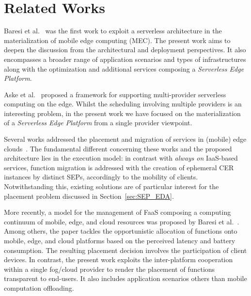 \section{Related Works}\label{sec:related_works}



Baresi et al.~\cite{GarrigaMendonca2017} was the first work to exploit a serverless architecture in the materialization of mobile edge computing (MEC). The present work aims to  deepen the discussion from the architectural and deployment perspectives. It also encompasses a broader range of application scenarios and types of infrastructures along with the optimization and additional services composing a \textit{Serverless Edge Platform}.

Aske et al.~\cite{Aske:2018} proposed a framework for supporting multi-provider serverless computing on the edge. Whilst the scheduling involving multiple 
providers is an interesting problem, in the present work we have focused on the materialization of a \textit{Serverless Edge Platform} from a single provider viewpoint. %

Several works addressed the placement and migration of services in (mobile) edge clouds~\cite{Wang:2015a,Plachy:2016,Machen:2018}. The fundamental different concerning these works and the proposed architecture lies in the execution model: in contrast with \textit{always on} IaaS-based services, %
function migration is addressed with the creation of ephemeral CER instances by distinct SEPs, accordingly to the mobility of clients. Notwithstanding this, existing solutions are of particular interest for the placement problem discussed in Section~\ref{sec:SEP_EDA}.

More recently, a model for the management of FaaS composing a computing continuum of mobile, edge, and cloud resources was proposed by Baresi et al.~\cite{Baresi:2018}. Among others, the paper tackles the opportunistic allocation of functions onto mobile, edge, and cloud platforms based on the perceived latency and battery consumption. The resulting placement decision involves the participation of client devices. In contrast, the present work exploits the inter-platform cooperation within a single fog/cloud provider to render the placement of functions transparent to end-users. It also includes application scenarios others than mobile computation offloading. 



